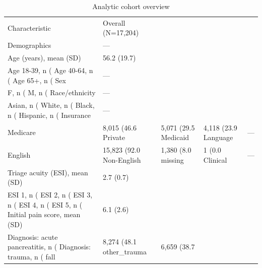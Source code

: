 \begin{table}[ht]
\centering
\caption{Analytic cohort overview}
\begin{tabular}{ll}
\hline
Characteristic & Overall
(N=17,204) \\
Demographics & — \\
Age (years), mean (SD) & 56.2 (19.7) \\
  Age 18-39, n (%
  Age 40-64, n (%
  Age 65+, n (%
Sex & — \\
  F, n (%
  M, n (%
Race/ethnicity & — \\
  Asian, n (%
  White, n (%
  Black, n (%
  Hispanic, n (%
Insurance & — \\
  Medicare & 8,015 (46.6%
  Private & 5,071 (29.5%
  Medicaid & 4,118 (23.9%
Language & — \\
  English & 15,823 (92.0%
  Non-English & 1,380 (8.0%
  missing & 1 (0.0%
Clinical & — \\
Triage acuity (ESI), mean (SD) & 2.7 (0.7) \\
  ESI 1, n (%
  ESI 2, n (%
  ESI 3, n (%
  ESI 4, n (%
  ESI 5, n (%
Initial pain score, mean (SD) & 6.1 (2.6) \\
Diagnosis: acute pancreatitis, n (%
Diagnosis: trauma, n (%
  fall & 8,274 (48.1%
  other_trauma & 6,659 (38.7%

\end{tabular}
\end{table}
